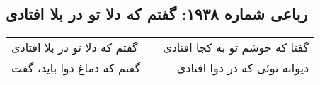 \begin{center}
\section*{رباعی شماره ۱۹۳۸: گفتم که دلا تو در بلا افتادی}
\label{sec:1938}
\begin{longtable}{l p{0.5cm} r}
گفتم که دلا تو در بلا افتادی
&&
گفتا که خوشم تو به کجا افتادی
\\
گفتم که دماغ دوا باید، گفت
&&
دیوانه توئی که در دوا افتادی
\\
\end{longtable}
\end{center}
